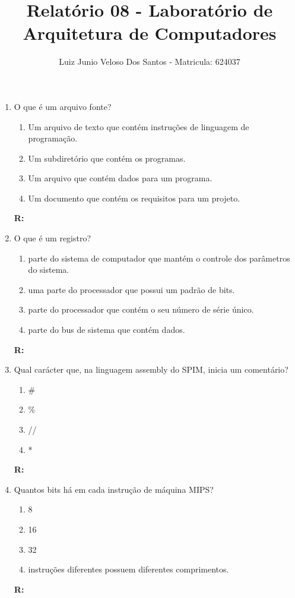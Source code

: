\documentclass[a4paper,11pt]{article}
\title{\vspace{-4cm}Relatório 08 - Laboratório de Arquitetura de Computadores}
\author{Luiz Junio Veloso Dos Santos - Matricula: 624037}
\begin{document}
 

\maketitle

\begin{enumerate}
    \item{O que é um arquivo fonte?}
        \begin{enumerate}
            \item{Um arquivo de texto que contém instruções de linguagem de programação.}
            \item{Um subdiretório que contém os programas.}
            \item{Um arquivo que contém dados para um programa.}
            \item{Um documento que contém os requisitos para um projeto.}
        \end{enumerate}
        \textbf{R: }

    \item{O que é um registro?}
        \begin{enumerate}
            \item{parte do sistema de computador que mantém o controle dos parâmetros do sistema.}
            \item{uma parte do processador que possui um padrão de bits.}
            \item{parte do processador que contém o seu número de série único.}
            \item{parte do bus de sistema que contém dados.}
        \end{enumerate}
        \textbf{R: }

    \item{Qual carácter que, na linguagem assembly do SPIM, inicia um comentário?}
        \begin{enumerate}
            \item{\#}
            \item{\%}
            \item{//}
            \item{*}
        \end{enumerate}
        \textbf{R:}

    \item{Quantos bits há em cada instrução de máquina MIPS?}
        \begin{enumerate}
            \item{8}
            \item{16}
            \item{32}
            \item{instruções diferentes possuem diferentes comprimentos.}
        \end{enumerate}
        \textbf{R:}


\end{enumerate}
\end{document}
